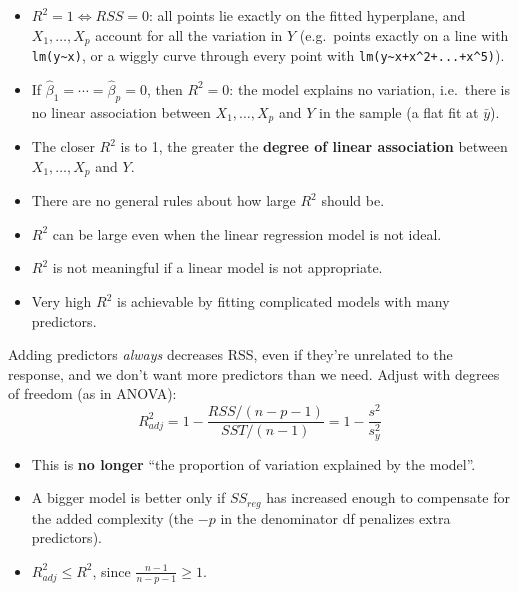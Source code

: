\begin{remark}
    \begin{itemize}
        \item $R^2=1\iff RSS=0$: all points lie exactly on the fitted hyperplane, and
        $X_1,\dots,X_p$ account for all the variation in $Y$ (e.g.\ points exactly on a line with
        \texttt{lm(y\textasciitilde x)}, or a wiggly curve through every point with
        \texttt{lm(y\textasciitilde x+x\^{}2+...+x\^{}5)}).
        \item If $\hat\beta_1=\cdots=\hat\beta_p=0$, then $R^2=0$: the model explains no variation,
        i.e.\ there is no linear association between $X_1,\dots,X_p$ and $Y$ in the sample
        (a flat fit at $\bar y$).
        \item The closer $R^2$ is to 1, the greater the \textbf{degree of linear association}
        between $X_1,\dots,X_p$ and $Y$.
    \end{itemize}
\end{remark}

\begin{remark}
    \begin{itemize}
        \item There are no general rules about how large $R^2$ should be.
        \item $R^2$ can be large even when the linear regression model is not ideal.
        \item $R^2$ is not meaningful if a linear model is not appropriate.
        \item Very high $R^2$ is achievable by fitting complicated models with many predictors.
    \end{itemize}
\end{remark}

\begin{definition}
    Adding predictors \emph{always} decreases RSS, even if they're unrelated to the response,
    and we don't want more predictors than we need. Adjust with degrees of freedom (as in ANOVA):
    \[\boxed{R^2_{adj}=1-\frac{RSS/(n-p-1)}{SST/(n-1)}=1-\frac{s^2}{s_y^2}}\]
    \begin{itemize}
        \item This is \textbf{no longer} ``the proportion of variation explained by the model''.
        \item A bigger model is better only if $SS_{reg}$ has increased enough to compensate for
        the added complexity (the $-p$ in the denominator df penalizes extra predictors).
        \item $R^2_{adj}\leq R^2$, since $\frac{n-1}{n-p-1}\geq1$.
    \end{itemize}
\end{definition}


